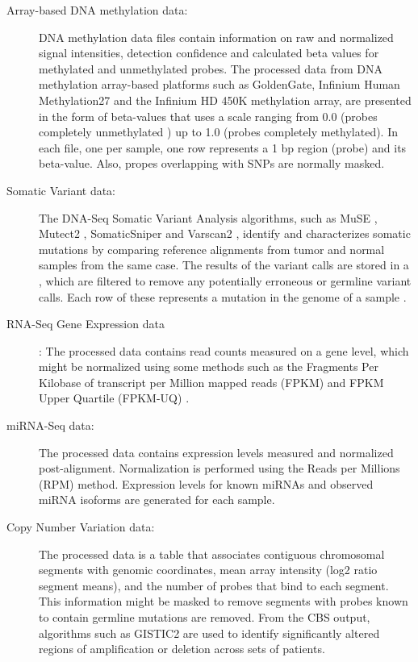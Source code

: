 \begin{description}
  \item [Array-based DNA methylation data:]
  DNA methylation data files contain information on raw and normalized signal intensities, detection confidence and calculated beta values for methylated and unmethylated probes.
  The processed data from DNA methylation array-based platforms such as GoldenGate, Infinium Human Methylation27 and the Infinium HD 450K methylation array, are presented in the form of beta-values that uses a scale ranging from 0.0 (probes completely unmethylated ) up to 1.0 (probes completely methylated). In each file, one per sample,  one row represents a 1 bp region (probe) and its beta-value. Also, propes overlapping with SNPs are normally masked.
  \item [Somatic Variant data:]  The DNA-Seq Somatic Variant Analysis algorithms, such as MuSE \cite{fan2016muse}, Mutect2 \cite{cibulskis2013sensitive}, SomaticSniper \cite{larson2011somaticsniper} and Varscan2 \cite{koboldt2012varscan},   identify and characterizes somatic mutations by comparing reference alignments from tumor and normal samples from the same case.  The   results of the variant calls are stored in a , which are filtered to remove any potentially erroneous or germline variant calls. Each row of these  represents a mutation in the genome of a sample \cite{GDC_maf}.
  \item [RNA-Seq Gene Expression data]: The processed data contains read counts measured on a gene level, which might be normalized using some methods such as the Fragments Per Kilobase of transcript per Million mapped reads (FPKM) \cite{GDC_fpmk} and FPKM Upper Quartile (FPKM-UQ) \cite{GDC_fpmkuq}.
  \item [miRNA-Seq  data:]  The processed data contains expression levels measured and normalized post-alignment. Normalization is performed using the Reads per Millions (RPM) method. Expression levels for known miRNAs and observed miRNA isoforms are generated for each sample.
  \item [Copy Number Variation data:] The processed data is a table that associates contiguous chromosomal segments with genomic coordinates, mean array intensity (log2 ratio segment means), and the number of probes that bind to each segment. This information might be masked to remove segments with probes known to contain germline mutations are removed.
  From the CBS output, algorithms such as GISTIC2 \cite{mermel2011gistic2} are used to identify significantly altered regions of amplification or deletion across sets of patients.

\end{description}
